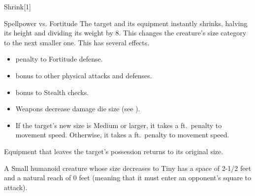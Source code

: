 \begin{spellsection}{Shrink}[1]
    \begin{spellheader}
    \end{spellheader}
    \begin{spellcontent}
        \begin{spelltargetinginfo}
        \end{spelltargetinginfo}
        \begin{spelleffects}
            \begin{spellattack}{Spellpower vs. Fortitude}
                \spellsuccess The target and its equipment instantly shrinks, halving its height and dividing its weight by 8. This changes the creature's size category to the next smaller one. This has several effects.
                \begin{itemize}
                    \item {} penalty to Fortitude defense.
                    \item {} bonus to other physical attacks and defenses.
                    \item {} bonus to Stealth checks.
                    \item Weapons decrease damage die size (see ).
                    \item If the target's new size is Medium or larger, it takes a  ft.\ penalty to movement speed. Otherwise, it takes a  ft.\ penalty to movement speed.
                \end{itemize}
                \par Equipment that leaves the target's possession returns to its original size.
            \end{spellattack}
            \spelldur \durshort \dismissable
        \end{spelleffects}
    \end{spellcontent}
    \begin{spellfooter}
        \spellnotes A Small humanoid creature whose size decreases to Tiny has a space of 2-1/2 feet and a natural reach of 0 feet (meaning that it must enter an opponent's square to attack).

        \sizingspellnotes
        \miscastrandom
    \end{spellfooter}
    \begin{spellaugments}
    \end{spellaugments}
\end{spellsection}

